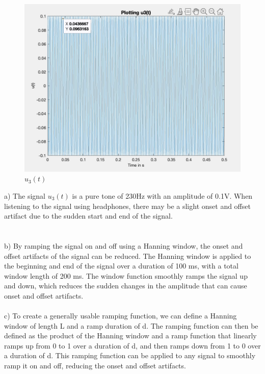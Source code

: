 \documentclass[
	a4paper,
	11pt,
]{article}
\begin{document}
\begin{figure}[htb!]
  \centering
  \includegraphics[width=\linewidth]{A67/a7.jpg}
  \caption{\(u_3(t)\)}
  \label{fig:sub1}
\end{figure}

a) The signal \(u_3(t)\) is a pure tone of 230Hz with an amplitude of 0.1V. When listening to the signal using headphones, there may be a slight onset and offset artifact due to the sudden start and end of the signal.\\
\\
\\
b) By ramping the signal on and off using a Hanning window, the onset and offset artifacts of the signal can be reduced. The Hanning window is applied to the beginning and end of the signal over a duration of 100 ms, with a total window length of 200 ms. The window function smoothly ramps the signal up and down, which reduces the sudden changes in the amplitude that can cause onset and offset artifacts.\\
\\
c) To create a generally usable ramping function, we can define a Hanning window of length L and a ramp duration of d. The ramping function can then be defined as the product of the Hanning window and a ramp function that linearly ramps up from 0 to 1 over a duration of d, and then ramps down from 1 to 0 over a duration of d. This ramping function can be applied to any signal to smoothly ramp it on and off, reducing the onset and offset artifacts.
\end{document}
